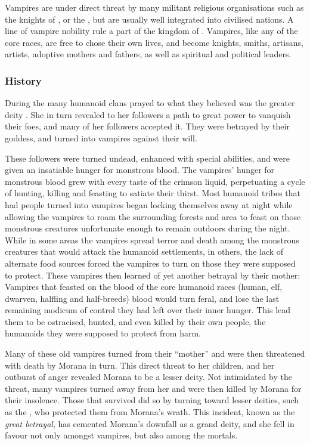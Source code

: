 Vampires are under direct threat by many militant religious organisations such
as the knights of , or the , but are
usually well integrated into civilised nations. A line of vampire nobility
rule a part of the kingdom of . Vampires, like any of
the core races, are free to chose their own lives, and become knights, smiths,
artisans, artists, adoptive mothers and fathers, as well as spiritual and
political leaders.

\subsubsection{History}

During the  many humanoid clans prayed to what
they believed was the greater deity . She in turn revealed
to her followers a path to great power to vanquish their foes, and many of her
followers accepted it. They were betrayed by their goddess, and turned into
vampires against their will.

These followers were turned undead, enhanced with special abilities, and were
given an insatiable hunger for monstrous blood. The vampires' hunger for
monstrous blood grew with every taste of the crimson liquid, perpetuating a
cycle of hunting, killing and feasting to satiate their thirst. Most humanoid
tribes that had people turned into vampires began locking themselves away at
night while allowing the vampires to roam the surrounding forests and area to
feast on those monstrous creatures unfortunate enough to remain outdoors
during the night. While in some areas the vampires spread terror and death
among the monstrous creatures that would attack the humanoid settlements, in
others, the lack of alternate food sources forced the vampires to turn on
those they were supposed to protect. These vampires then learned of yet
another betrayal by their mother: Vampires that feasted on the blood of the
core humanoid races (human, elf, dwarven, halfling and half-breeds) blood
would turn feral, and lose the last remaining modicum of control they had left
over their inner hunger. This lead them to be ostracised, hunted, and even
killed by their own people, the humanoids they were supposed to protect from
harm.

Many of these old vampires turned from their ``mother'' and were then
threatened with death by Morana in turn. This direct threat to her children,
and her outburst of anger revealed Morana to be a lesser deity. Not
intimidated by the threat, many vampires turned away from her and were then
killed by Morana for their insolence. Those that survived did so by turning
toward lesser deities, such as the , who protected
them from Morana's wrath. This incident, known as the \emph{great betrayal},
has cemented Morana's downfall as a grand deity, and she fell in favour not
only amongst vampires, but also among the mortals.

